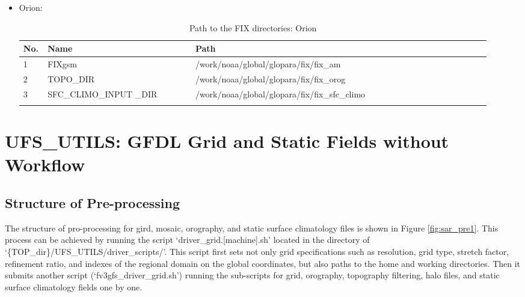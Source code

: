 \documentclass[11pt,fleqn]{report}              %
\begin{document}
\begin{itemize}
\item Orion:
{
\fontsize{10}{12}\selectfont
\begin{longtable}{p{0.03\linewidth} | p{0.3\linewidth} | p{0.6\linewidth} }
\hline
\hline
No. & Name & Path \\
\hline
1 & FIXgsm & /work/noaa/global/glopara/fix/fix\_am \\
2 & TOPO\_DIR & /work/noaa/global/glopara/fix/fix\_orog \\
3 & SFC\_CLIMO\_INPUT \_DIR & /work/noaa/global/glopara/fix/fix\_sfc\_climo \\
\hline
\caption{Path to the FIX directories: Orion}
\label{table:fix_dir_hera}
\end{longtable}
}

\end{itemize}





\chapter{UFS\_UTILS: GFDL Grid and Static Fields without Workflow}                 
\label{chpt:sar_grd_fix_gfdl}


\section{Structure of Pre-processing}
\label{sec:sar_pre_grd_flow}

The structure of pro-processing for gird, mosaic, orography, and static surface climatology files is shown in Figure \ref{fig:sar_pre1}. This process can be achieved by running the script `driver\_grid.[machine].sh' located in the directory of `\{TOP\_dir\}/UFS\_UTILS/driver\_scripts/'. This script first sets not only grid specifications such as resolution, grid type, stretch factor, refinement ratio, and indexes of the regional domain on the global coordinates, but also paths to the home and working directories. Then it submits another script (`fv3gfs\_driver\_grid.sh') running the sub-scripts for grid, orography, topography filtering, halo files, and static surface climatology fields one by one.
\end{document}
